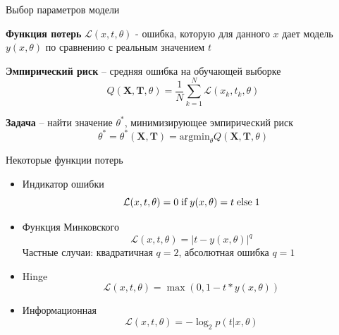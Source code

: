 \documentclass[10pt,a4paper]{beamer}
\begin{document}

\begin{frame}{Выбор параметров модели}

{\bf Функция потерь} $\mathcal{L}(x, t, \theta)$ - ошибка, которую для данного $x$ дает модель $y(x, \theta)$ по сравнению с реальным значением $t$
\vspace{1em}

{\bf Эмпирический риск} -- средняя ошибка на обучающей выборке
\[
Q(\boldsymbol X, \boldsymbol T, \theta) = \frac{1}{N} \sum_{k=1}^N \mathcal{L}(x_k, t_k, \theta)
\]
\vspace{1em}

{\bf Задача} -- найти значение $\theta^*$, минимизирующее эмпирический риск
\[
\theta^* = \theta^*(\boldsymbol X, \boldsymbol T) = \text{argmin}_\theta Q(\boldsymbol X, \boldsymbol T, \theta)
\]

\end{frame}


\begin{frame}{Некоторые функции потерь}

\begin{itemize}
\item Индикатор ошибки
\[
\mathcal{L}(x, t, \theta) = 0 \text{\;if\;} y(x, \theta)  = t \text{\;else\;} 1
\]
\item Функция Минковского 
\[
\mathcal{L}(x, t, \theta) = |t - y(x, \theta)|^q
\]
Частные случаи: квадратичная $q = 2$, абсолютная ошибка $q = 1$
\item Hinge
\[
\mathcal{L}(x, t, \theta) = \max(0, 1 - t * y(x, \theta))
\]
\item Информационная
\[
\mathcal{L}(x, t, \theta) = - \log_2 p(t | x, \theta)
\]
\begin{center}

\end{center}
\end{itemize}

\end{frame}

\end{document}
